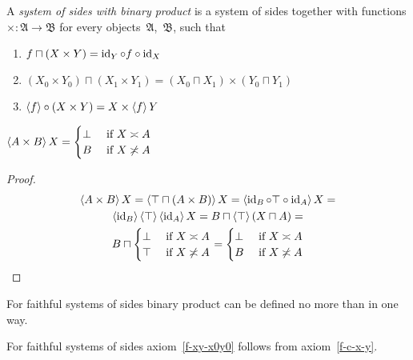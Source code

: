 \begin{defn}
A \emph{system of sides with binary product} is a system of sides together with functions $\mathord{\times}:\mathfrak{A}\rightarrow\mathfrak{B}$
for every objects~$\mathfrak{A}$,~$\mathfrak{B}$, such that
\begin{enumerate}
\item \label{f-c-x-y}$f\sqcap(X\times Y) = \operatorname{id}_Y\circ f\circ\operatorname{id}_X$
\item \label{f-xy-x0y0}$(X_0\times Y_0)\sqcap(X_1\times Y_1) = (X_0\sqcap X_1)\times(Y_0\sqcap Y_1)$
\item $\left\langle f\right\rangle\circ(X\times Y) = X\times\left\langle f\right\rangle Y$
\end{enumerate}
\end{defn}

\begin{prop}
$\left\langle A\times B\right\rangle X = \begin{cases}\bot&\text{ if }X\asymp A\\B&\text{ if }X\not\asymp A\end{cases}$
\end{prop}

\begin{proof}
~
\begin{multline*}
\left\langle A\times B\right\rangle X = \left\langle \top\sqcap(A\times B)\right\rangle X = \left\langle \operatorname{id}_B\circ\top\circ\operatorname{id}_A\right\rangle X = \\
\left\langle \operatorname{id}_B\right\rangle\left\langle \top\right\rangle\left\langle \operatorname{id}_A\right\rangle X =
B\sqcap\left\langle \top\right\rangle(X\sqcap A) = \\
B\sqcap\begin{cases}\bot&\text{ if }X\asymp A\\\top&\text{ if }X\not\asymp A\end{cases} =
\begin{cases}\bot&\text{ if }X\asymp A\\B&\text{ if }X\not\asymp A\end{cases}
\end{multline*}
\end{proof}

\begin{cor}
For faithful systems of sides binary product can be defined no more than in one way.
\end{cor}

\begin{prop}
For faithful systems of sides axiom~\ref{f-xy-x0y0} follows from axiom~\ref{f-c-x-y}.
\end{prop}

